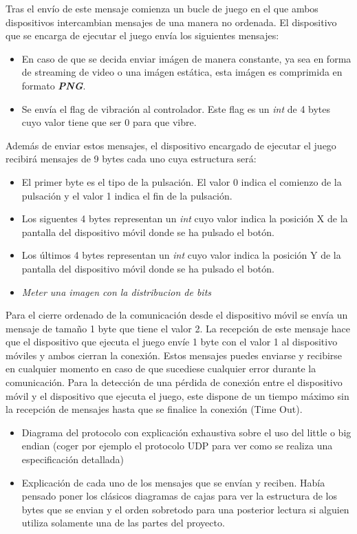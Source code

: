 Tras el env\'io de este mensaje comienza un bucle de juego en el que ambos dispositivos intercambian mensajes de una manera no ordenada. El dispositivo que se encarga de ejecutar el juego env\'ia los siguientes mensajes:
\begin {itemize}
\item En caso de que se decida enviar im\'agen de manera constante, ya sea en forma de streaming de video o una im\'agen est\'atica, esta im\'agen es comprimida en formato \textbf{\textit{PNG}}.
\item Se env\'ia el flag de vibraci\'on al controlador. Este flag es un \textit{int} de 4 bytes cuyo valor tiene que ser 0 para que vibre.
\end {itemize}

Adem\'as de enviar estos mensajes, el dispositivo encargado de ejecutar el juego recibir\'a mensajes de 9 bytes cada uno cuya estructura ser\'a:
\begin {itemize}
\item El primer byte es el tipo de la pulsaci\'on. El valor 0 indica el comienzo de la pulsaci\'on y el valor 1 indica el fin de la pulsaci\'on.
\item Los siguentes 4 bytes representan un \textit{int} cuyo valor indica la posici\'on X de la pantalla del dispositivo m\'ovil donde se ha pulsado el bot\'on.
\item Los \'ultimos 4 bytes representan un \textit{int} cuyo valor indica la posici\'on Y de la pantalla del dispositivo m\'ovil donde se ha pulsado el bot\'on.
\item \textit{Meter una imagen con la distribucion de bits}
\end {itemize}

Para el cierre ordenado de la comunicaci\'on desde el dispositivo m\'ovil se env\'ia un mensaje de tama\~no 1 byte que tiene el valor 2. La recepci\'on de este mensaje hace que el dispositivo que ejecuta el juego env\'ie 1 byte con el valor 1 al dispositivo m\'oviles y ambos cierran la conexi\'on. Estos mensajes puedes enviarse y recibirse en cualquier momento en caso de que sucediese cualquier error durante la comunicaci\'on. Para la detecci\'on de una p\'erdida de conexi\'on entre el dispositivo m\'ovil y el dispositivo que ejecuta el juego, este dispone de un tiempo m\'aximo sin la recepci\'on de mensajes hasta que se finalice la conexi\'on (Time Out).

\begin {itemize}
\item Diagrama del protocolo con explicaci\'on exhaustiva sobre el uso del little o big endian (coger por ejemplo el protocolo UDP para ver como se realiza una especificaci\'on detallada)
\item Explicaci\'on de cada uno de los mensajes que se env\'ian y reciben. Hab\'ia pensado poner los cl\'asicos diagramas de cajas para ver la estructura de los bytes que se envian y el orden sobretodo para una posterior lectura si alguien utiliza solamente una de las partes del proyecto.
\end {itemize}



